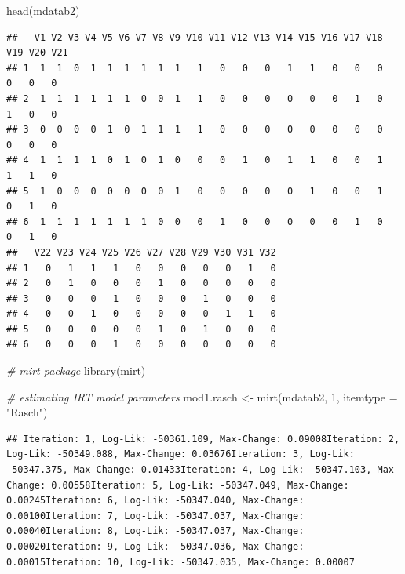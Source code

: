 \documentclass[
]{book}
\newenvironment{Shaded}{\begin{snugshade}}{\end{snugshade}}
\newcommand{\AttributeTok}[1]{\textcolor[rgb]{0.77,0.63,0.00}{#1}}
\newcommand{\CommentTok}[1]{\textcolor[rgb]{0.56,0.35,0.01}{\textit{#1}}}
\newcommand{\DecValTok}[1]{\textcolor[rgb]{0.00,0.00,0.81}{#1}}
\newcommand{\FunctionTok}[1]{\textcolor[rgb]{0.00,0.00,0.00}{#1}}
\newcommand{\NormalTok}[1]{#1}
\newcommand{\OtherTok}[1]{\textcolor[rgb]{0.56,0.35,0.01}{#1}}
\newcommand{\StringTok}[1]{\textcolor[rgb]{0.31,0.60,0.02}{#1}}
\begin{document}
\begin{Shaded}
\begin{Highlighting}[]
\FunctionTok{head}\NormalTok{(mdatab2)}
\end{Highlighting}
\end{Shaded}

\begin{verbatim}
##   V1 V2 V3 V4 V5 V6 V7 V8 V9 V10 V11 V12 V13 V14 V15 V16 V17 V18 V19 V20 V21
## 1  1  1  0  1  1  1  1  1  1   1   0   0   0   1   1   0   0   0   0   0   0
## 2  1  1  1  1  1  1  0  0  1   1   0   0   0   0   0   0   1   0   1   0   0
## 3  0  0  0  0  1  0  1  1  1   1   0   0   0   0   0   0   0   0   0   0   0
## 4  1  1  1  1  0  1  0  1  0   0   0   1   0   1   1   0   0   1   1   1   0
## 5  1  0  0  0  0  0  0  0  1   0   0   0   0   0   1   0   0   1   0   1   0
## 6  1  1  1  1  1  1  1  0  0   0   1   0   0   0   0   0   1   0   0   1   0
##   V22 V23 V24 V25 V26 V27 V28 V29 V30 V31 V32
## 1   0   1   1   1   0   0   0   0   0   1   0
## 2   0   1   0   0   0   1   0   0   0   0   0
## 3   0   0   0   1   0   0   0   1   0   0   0
## 4   0   0   1   0   0   0   0   0   1   1   0
## 5   0   0   0   0   0   1   0   1   0   0   0
## 6   0   0   0   1   0   0   0   0   0   0   0
\end{verbatim}

\begin{Shaded}
\begin{Highlighting}[]
\CommentTok{\# mirt package}
\FunctionTok{library}\NormalTok{(mirt)}

\CommentTok{\# estimating IRT model parameters}
\NormalTok{mod1.rasch }\OtherTok{\textless{}{-}} \FunctionTok{mirt}\NormalTok{(mdatab2, }\DecValTok{1}\NormalTok{, }\AttributeTok{itemtype =} \StringTok{"Rasch"}\NormalTok{)}
\end{Highlighting}
\end{Shaded}

\begin{verbatim}
## Iteration: 1, Log-Lik: -50361.109, Max-Change: 0.09008Iteration: 2, Log-Lik: -50349.088, Max-Change: 0.03676Iteration: 3, Log-Lik: -50347.375, Max-Change: 0.01433Iteration: 4, Log-Lik: -50347.103, Max-Change: 0.00558Iteration: 5, Log-Lik: -50347.049, Max-Change: 0.00245Iteration: 6, Log-Lik: -50347.040, Max-Change: 0.00100Iteration: 7, Log-Lik: -50347.037, Max-Change: 0.00040Iteration: 8, Log-Lik: -50347.037, Max-Change: 0.00020Iteration: 9, Log-Lik: -50347.036, Max-Change: 0.00015Iteration: 10, Log-Lik: -50347.035, Max-Change: 0.00007
\end{verbatim}
\end{document}
